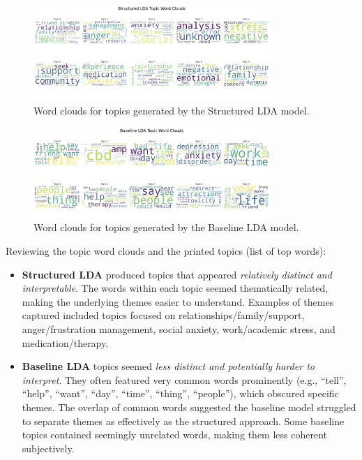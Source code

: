 \documentclass{article}
\begin{document}
\begin{figure}[ht]
    \centering
    \includegraphics[width=0.8\textwidth]{plots/structuredLDATopicWordClouds.jpeg}
    \caption{Word clouds for topics generated by the Structured LDA model.}
    \label{fig:wordcloud-structured}
\end{figure}

\begin{figure}[ht]
    \centering
    \includegraphics[width=0.8\textwidth]{plots/BaselineLDATopicWordClouds.jpeg}
    \caption{Word clouds for topics generated by the Baseline LDA model.}
    \label{fig:wordcloud-baseline}
\end{figure}

Reviewing the topic word clouds and the printed topics (list of top words):
\begin{itemize}[leftmargin=*]
    \item \textbf{Structured LDA} produced topics that appeared \emph{relatively distinct and interpretable}. The words within each topic seemed thematically related, making the underlying themes easier to understand. Examples of themes captured included topics focused on relationships/family/support, anger/frustration management, social anxiety, work/academic stress, and medication/therapy.
    \item \textbf{Baseline LDA} topics seemed \emph{less distinct and potentially harder to interpret}. They often featured very common words prominently (e.g., ``tell'', ``help'', ``want'', ``day'', ``time'', ``thing'', ``people''), which obscured specific themes. The overlap of common words suggested the baseline model struggled to separate themes as effectively as the structured approach. Some baseline topics contained seemingly unrelated words, making them less coherent subjectively.
\end{itemize}
\end{document}
